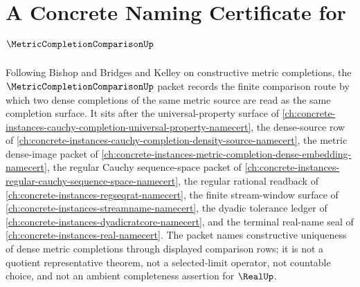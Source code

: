 \chapter{A Concrete Naming Certificate for $\MetricCompletionComparisonUp$}
\label{ch:concrete-instances-metric-completion-comparison-namecert}

Following Bishop and Bridges and Kelley on constructive metric completions, the $\MetricCompletionComparisonUp$ packet records the finite comparison route by which two dense completions of the same metric source are read as the same completion surface. It sits after the universal-property surface of \autoref{ch:concrete-instances-cauchy-completion-universal-property-namecert}, the dense-source row of \autoref{ch:concrete-instances-cauchy-completion-density-source-namecert}, the metric dense-image packet of \autoref{ch:concrete-instances-metric-completion-dense-embedding-namecert}, the regular Cauchy sequence-space packet of \autoref{ch:concrete-instances-regular-cauchy-sequence-space-namecert}, the regular rational readback of \autoref{ch:concrete-instances-regseqrat-namecert}, the finite stream-window surface of \autoref{ch:concrete-instances-streamname-namecert}, the dyadic tolerance ledger of \autoref{ch:concrete-instances-dyadicratcore-namecert}, and the terminal real-name seal of \autoref{ch:concrete-instances-real-namecert}. The packet names constructive uniqueness of dense metric completions through displayed comparison rows; it is not a quotient representative theorem, not a selected-limit operator, not countable choice, and not an ambient completeness assertion for $\RealUp$.

